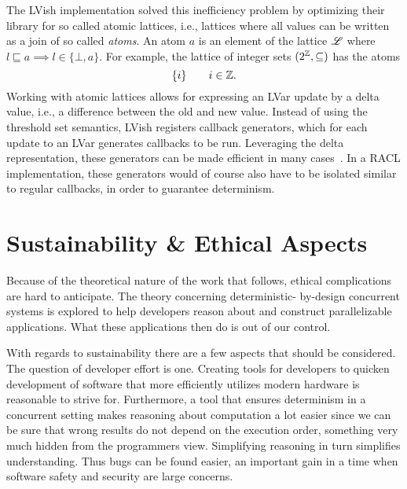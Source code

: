 The LVish implementation solved this inefficiency problem by optimizing their
library for so called atomic lattices, i.e., lattices where all values can be
written as a join of so called \emph{atoms}. An atom $a$ is an element of the
lattice $\mbox{$\mathscr{L}$}$ where $l \sqsubseteq a \implies l \in \{\bot, a\}$. For
example, the lattice of integer sets $(2^{\mathbb{Z}}, \subseteq)$ has the atoms
\begin{equation*}
  \{ i \} \quad\quad i \in \mathbb{Z}.
\end{equation*}
Working with atomic lattices allows for expressing an LVar update by a delta
value, i.e., a difference between the old and new value. Instead of using the
threshold set semantics, LVish registers callback generators, which for each
update to an LVar generates callbacks to be run. Leveraging the delta
representation, these generators can be made efficient in many
cases~\parencite{kuper2014freeze}. In a RACL implementation, these generators
would of course also have to be isolated similar to regular callbacks, in
order to guarantee determinism.

\section{Sustainability \& Ethical Aspects}%
\label{sec:sustainability_&_ethical_aspects}

Because of the theoretical nature of the work that follows, ethical
complications are hard to anticipate. The theory concerning deterministic\hyp
by-design concurrent systems is explored to help developers reason about and
construct parallelizable applications. What these applications then do is out of
our control.

With regards to sustainability there are a few aspects that should be
considered. The question of developer effort is one. Creating tools for
developers to quicken development of software that more efficiently utilizes
modern hardware is reasonable to strive for.  Furthermore, a tool that ensures
determinism in a concurrent setting makes reasoning about computation a lot
easier since we can be sure that wrong results do not depend on the execution
order, something very much hidden from the programmers view. Simplifying
reasoning in turn simplifies understanding. Thus bugs can be found easier, an
important gain in a time when software safety and security are large concerns.

